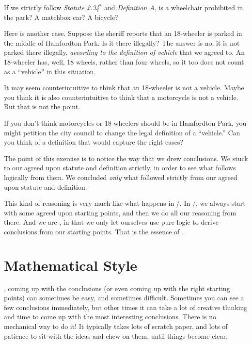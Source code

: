 \documentclass[../../../main.tex]{subfiles}
\begin{document}
\begin{aside}
  \begin{example}
    If we strictly follow \emph{Statute 2.34$^{*}$} and \emph{Definition A}, is a wheelchair prohibited in the park? A matchbox car? A bicycle?
  \end{example}
\end{aside}

Here is another case. Suppose the sheriff reports that an 18-wheeler is parked in the middle of Hamfordton Park. Is it there illegally? The answer is no, it is not parked there illegally, \emph{according to the definition of vehicle} that we agreed to. An 18-wheeler has, well, 18 wheels, rather than four wheels, so it too does not count as a ``vehicle'' in this situation.

It may seem counterintuitive to think that an 18-wheeler is not a vehicle. Maybe you think it is also counterintuitive to think that a motorcycle is not a vehicle. But that is not the point.

\begin{aside}
  \begin{remark}
    If you don't think motorcycles or 18-wheelers should be in Hamfordton Park, you might petition the city council to change the legal definition of a ``vehicle.'' Can you think of a definition that would capture the right cases?
  \end{remark}
\end{aside}

The point of this exercise is to notice the way that we drew conclusions. We stuck to our agreed upon statute and definition strictly, in order to see what follows logically from them. We concluded \emph{only} what followed strictly from our agreed upon statute and definition.

This kind of reasoning is very much like what happens in \math/. In \math/, we always start with some agreed upon starting points, and then we do all our reasoning from there. And we are , in that we only let ourselves use pure logic to derive conclusions from our starting points. That is the essence of .


\section{Mathematical Style}

, coming up with the conclusions (or even coming up with the right starting points) can sometimes be easy, and sometimes difficult. Sometimes you can see a few conclusions immediately, but other times it can take a lot of creative thinking and time to come up with the most interesting conclusions. There is no mechanical way to do it! It typically takes lots of scratch paper, and lots of patience to sit with the ideas and chew on them, until things become clear.
\end{document}
